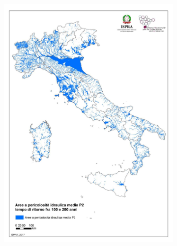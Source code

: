 \begin{figure}
\begin{subfigure}{.475\textwidth}
        \includegraphics[width=\textwidth]{figures/ita_flood/p2}
    \end{subfigure}\\
    \begin{subfigure}{.475\textwidth}
        \caption{}\label{fig:ispra_ita_flood/c}

\end{subfigure}
\end{figure}
